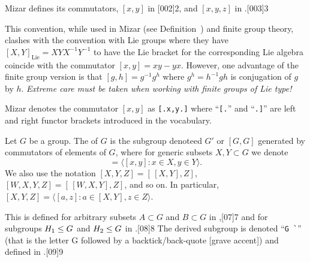 \begin{def-remark}
Mizar defines its commutators, $[x,y]$ in [002]{2}, and
$[x,y,z]$ in .[003]{3}
\end{def-remark}

\begin{def-remark}
This convention, while used in Mizar (see Definition~)
and finite group theory, clashes with the convention with Lie groups
where they have $[X,Y]_{\text{Lie}}=XYX^{-1}Y^{-1}$ to have the Lie
bracket for the corresponding Lie algebra coincide with the commutator
$[x,y] = xy - yx$. However, one advantage of the finite group version is
that $[g,h] = g^{-1}g^{h}$ where $g^{h}=h^{-1}gh$ is conjugation of $g$
by $h$. \emph{Extreme care must be taken when working with finite groups
of Lie type!}
\end{def-remark}

\begin{notation}
  Mizar denotes the commutator $[x,y]$ as \lstinline![.x,y.]! where
  ``\verb#[.#'' and ``\verb#.]#'' are left and right functor brackets
  introduced in the  vocabulary.
\end{notation}

\begin{definition}\index{$[G,G]$}
Let $G$ be a group. The  of $G$ is the subgroup
denoteed $G'$ or $[G,G]$ generated by commutators of elements of $G$, where
for generic subsets $X,Y\subset G$ we denote
\begin{equation}
  [X,Y] = \langle [x,y] : x\in X,y\in Y\rangle.
\end{equation}
We also use the notation $[X,Y,Z] = [\,{[X,Y]},Z]$, $[W,X,Y,Z] = [\,{[W,X,Y]},Z]$,
and so on. In particular, $[X,Y,Z] = \langle [a,z] : a\in[X,Y], z\in Z\rangle$.
\end{definition}

\begin{def-remark}
This is defined for arbitrary subsets $A\subset G$ and $B\subset G$ in
,[07]{7} and for subgroups $H_{1}\leq G$ and
$H_{2}\leq G$ in .[08]{8} The derived subgroup is
denoted ``\verb#G `#'' (that is the letter G followed by a
backtick/back-quote [grave accent]) and defined in .[09]{9}
\end{def-remark}

